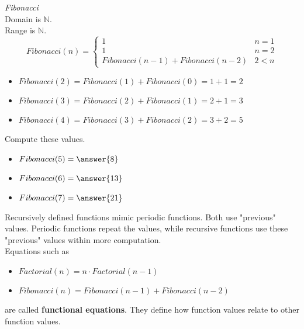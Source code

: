 \documentclass{ximera}
\begin{document}
\begin{example}  \textit{Fibonacci} \\


Domain is $\mathbb{N}$. \\
Range is $\mathbb{N}$. \\



\[
Fibonacci(n) = 
\begin{cases}
  1 & n = 1 \\
  1 & n = 2 \\ 
  Fibonacci(n-1) + Fibonacci(n-2) & 2 < n
\end{cases}
\]


\begin{itemize}
\item $Fibonacci(2) = Fibonacci(1) + Fibonacci(0) = 1 + 1 = 2$
\item $Fibonacci(3) = Fibonacci(2) + Fibonacci(1) = 2 + 1 = 3$
\item $Fibonacci(4) = Fibonacci(3) + Fibonacci(2) = 3 + 2 = 5$
\end{itemize}




\begin{question} Compute these values.


\begin{itemize}
\item $Fibonacci(5) = \answer{8}$
\item $Fibonacci(6) = \answer{13}$
\item $Fibonacci(7) = \answer{21}$
\end{itemize}


\end{question}



\end{example}






Recursively defined functions mimic periodic functions.  Both use "previous" values.  Periodic functions repeat the values, while recursive functions use these "previous" values within more computation. \\


Equations such as

\begin{itemize}
\item $Factorial(n) = n \cdot Factorial(n-1)$
\item $Fibonacci(n) = Fibonacci(n-1) + Fibonacci(n-2)$
\end{itemize}

are called \textbf{functional equations}.  They define how function values relate to other function values.
\end{document}

